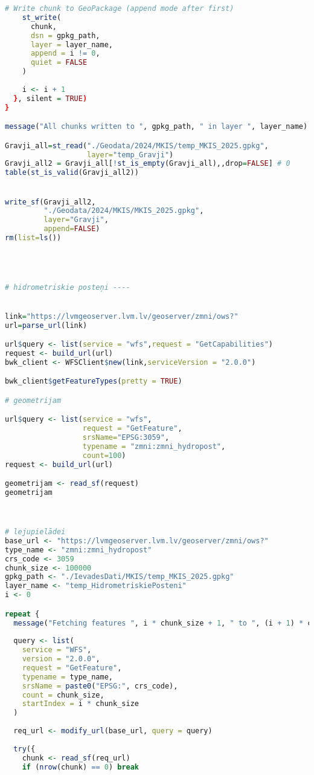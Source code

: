 \documentclass[
]{book}
\begin{document}
\begin{lstlisting}[language=R]
    # Write chunk to GeoPackage (append mode after first)
    st_write(
      chunk, 
      dsn = gpkg_path,
      layer = layer_name,
      append = i != 0,
      quiet = FALSE
    )
    
    i <- i + 1
  }, silent = TRUE)
}

message("All chunks written to ", gpkg_path, " in layer ", layer_name)

Gravji_all=st_read("./Geodata/2024/MKIS/temp_MKIS_2025.gpkg",
                   layer="temp_Gravji")
Gravji_all2 = Gravji_all[!st_is_empty(Gravji_all),,drop=FALSE] # 0
table(st_is_valid(Gravji_all2))


write_sf(Gravji_all2,
         "./Geodata/2024/MKIS/MKIS_2025.gpkg",
         layer="Gravji",
         append=FALSE)
rm(list=ls())




# hidrometriskie posteņi ----


link="https://lvmgeoserver.lvm.lv/geoserver/zmni/ows?"
url=parse_url(link)

url$query <- list(service = "wfs",request = "GetCapabilities")
request <- build_url(url)
bwk_client <- WFSClient$new(link,serviceVersion = "2.0.0")

bwk_client$getFeatureTypes(pretty = TRUE)

# geometrijam

url$query <- list(service = "wfs",
                  request = "GetFeature",
                  srsName="EPSG:3059",
                  typename = "zmni:zmni_hydropost",
                  count=100)
request <- build_url(url)

geometrijam <- read_sf(request)
geometrijam



# lejupielādei
base_url <- "https://lvmgeoserver.lvm.lv/geoserver/zmni/ows?"
type_name <- "zmni:zmni_hydropost"
crs_code <- 3059
chunk_size <- 100000
gpkg_path <- "./IevadesDati/MKIS/temp_MKIS_2025.gpkg"
layer_name <- "temp_HidrometriskiePosteni"
i <- 0

repeat {
  message("Fetching features ", i * chunk_size + 1, " to ", (i + 1) * chunk_size, "...")
  
  query <- list(
    service = "WFS",
    version = "2.0.0",
    request = "GetFeature",
    typename = type_name,
    srsName = paste0("EPSG:", crs_code),
    count = chunk_size,
    startIndex = i * chunk_size
  )
  
  req_url <- modify_url(base_url, query = query)
  
  try({
    chunk <- read_sf(req_url)
    if (nrow(chunk) == 0) break
    

\end{lstlisting}
\end{document}
